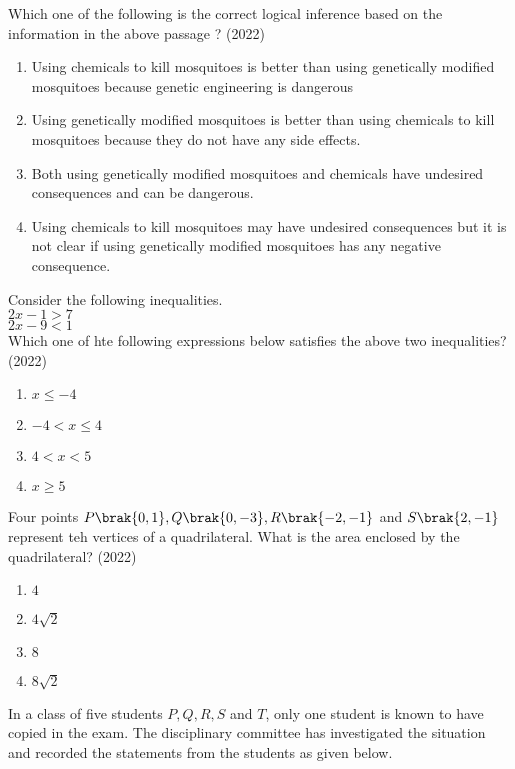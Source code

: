 Which one of the following is the correct logical inference based on the information in the above passage ?
\hfill{(2022)}
        \begin{enumerate}
            \item Using chemicals to kill mosquitoes is better than using genetically modified mosquitoes because genetic engineering is dangerous
            \item Using genetically modified mosquitoes is better than using chemicals to kill mosquitoes because they do not have any side effects.
            \item Both using genetically modified mosquitoes and chemicals have undesired consequences and can be dangerous.
            \item Using chemicals to kill mosquitoes may have undesired consequences but it is not clear if using genetically modified mosquitoes has any negative consequence.
        \end{enumerate}
	\item Consider the following inequalities.\\ 
           $2x-1> 7$\\
           $2x-9 <1$\\
          Which one of hte following expressions below satisfies the above two inequalities?
          \hfill{(2022)}
          \begin{enumerate}
              \item $x\leq -4$
              \item $-4<x \leq 4$
              \item $4<x<5$
              \item $x\geq 5$
          \end{enumerate}
	\item Four points $P\brak{0,1},Q\brak{0,-3},R\brak{-2,-1}$ and $S\brak{2,-1}$ represent teh vertices of a quadrilateral. What is the area enclosed by the quadrilateral?
	\hfill{(2022)}
    \begin{enumerate}
          \item $4$
          \item $4\sqrt{2}$
          \item $8$
          \item $8\sqrt{2}$
    \end{enumerate}
	\item In a class of five students $P,Q,R,S$ and $T$, only one student is known to have copied in the exam. The disciplinary committee has investigated the situation and recorded the statements from the students as given below.\\
